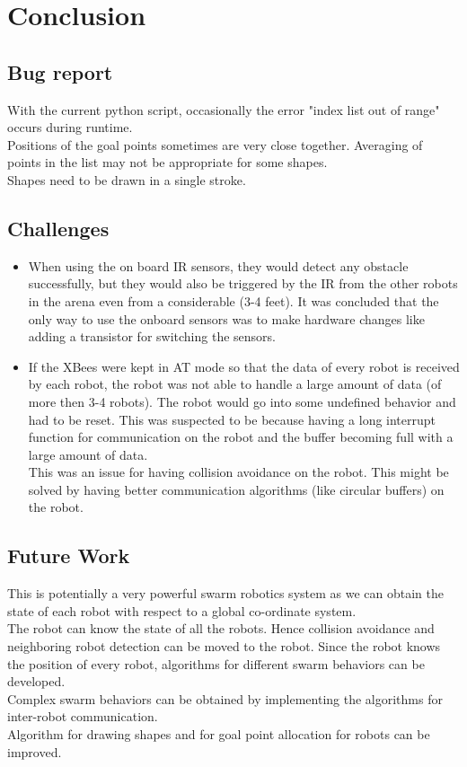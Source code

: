 \documentclass[a4paper,12pt,oneside]{book}
\begin{document}
	\chapter[Conclusion]{Conclusion}			
	\section{Bug report}
	With the current python script, occasionally the error "index list out of range" occurs during runtime.\\
	Positions of the goal points sometimes are very close together. Averaging of points in the list may not be appropriate for some shapes.\\
	Shapes need to be drawn in a single stroke.\\
	
	\section{Challenges}
	\begin{itemize}
		\item When using the on board IR sensors, they would detect any obstacle successfully, but they would also be triggered by the IR from the other robots in the arena even from a considerable (3-4 feet). It was concluded that the only way to use the onboard sensors was to make hardware changes like adding a transistor for switching the sensors.
		\item If the XBees were kept in AT mode so that the data of every robot is received by each robot, the robot was not able to handle a large amount of data (of more then 3-4 robots). The robot would go into some undefined behavior and had to be reset. This was suspected to be because having a long interrupt function for communication on the robot and the buffer becoming full with a large amount of data.\\
		This was an issue for having collision avoidance on the robot. This might be solved by having better communication algorithms (like circular buffers) on the robot.
	\end{itemize}
	
	\section{Future Work}
	This is potentially a very powerful swarm robotics system as we can obtain the state of each robot with respect to a global co-ordinate system.\\
	The robot can know the state of all the robots. Hence collision avoidance and neighboring robot detection can be moved to the robot. Since the robot knows the position of every robot, algorithms for different swarm behaviors can be developed.\\
	Complex swarm behaviors can be obtained by implementing the algorithms for inter-robot communication.\\
	Algorithm for drawing shapes and for goal point allocation for robots can be improved.\\
	
\end{document}
